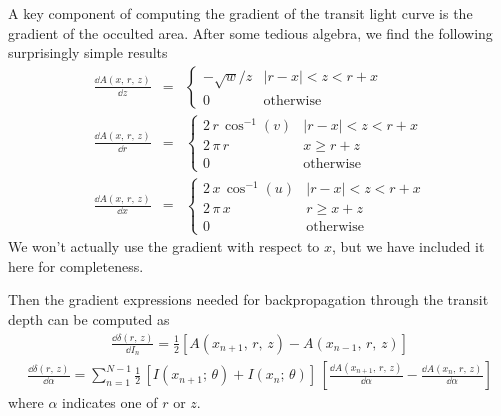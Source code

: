 \documentclass[modern]{aastex62}
\begin{document}
A key component of computing the gradient of the transit light curve is the
gradient of the occulted area.
After some tedious algebra, we find the following surprisingly simple results
\begin{eqnarray}
\frac{\dd A(x,\,r,\,z)}{\dd z} &=& \left\{\begin{array}{ll}
-\sqrt{w}/z &
    \left|r-x\right| < z < r + x \\
0 & \mathrm{otherwise}
\end{array}\right.\\
\frac{\dd A(x,\,r,\,z)}{\dd r} &=& \left\{\begin{array}{ll}
2\,r\,\cos^{-1}(v) & \left|r-x\right| < z < r + x \\
2\,\pi\,r & x \ge r + z \\
0 & \mathrm{otherwise}
\end{array}\right.\\
\frac{\dd A(x,\,r,\,z)}{\dd x} &=& \left\{\begin{array}{ll}
2\,x\,\cos^{-1}(u) & \left|r-x\right| < z < r + x \\
2\,\pi\,x & r \ge x + z \\
0 & \mathrm{otherwise}
\end{array}\right.
\end{eqnarray}
We won't actually use the gradient with respect to $x$, but we have included
it here for completeness.

Then the gradient expressions needed for backpropagation through the transit
depth can be computed as
\begin{eqnarray}
\frac{\dd \delta(r,\,z)}{\dd I_n} = \frac{1}{2}
    \left[A(x_{n+1},\,r,\,z) - A(x_{n-1},\,r,\,z)\right]
\end{eqnarray}
\begin{eqnarray}
\frac{\dd \delta(r,\,z)}{\dd \alpha} = \sum_{n=1}^{N-1} \frac{1}{2}\,\left[
I(x_{n+1};\,\theta) + I(x_n;\,\theta)\right]\,
\left[\frac{\dd A(x_{n+1},\,r,\,z)}{\dd\alpha} -
\frac{\dd A(x_n,\,r,\,z)}{\dd \alpha}\right]
\end{eqnarray}
where $\alpha$ indicates one of $r$ or $z$.



\end{document}
